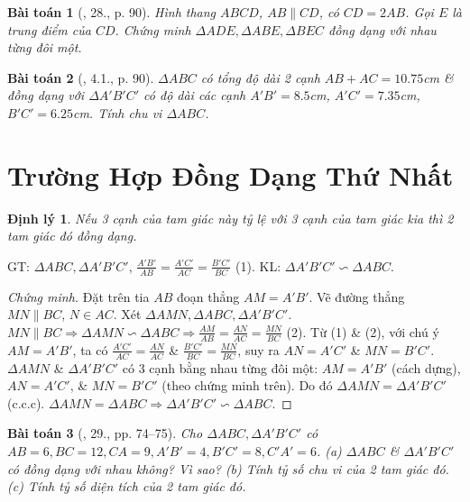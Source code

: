 \documentclass{article}
\newtheorem{baitoan}{Bài toán}
\newtheorem{dinhly}{Định lý}
\begin{document}
\begin{baitoan}[\cite{SBT_Toan_8_tap_2}, 28., p. 90]
	Hình thang $ABCD$, $AB\parallel CD$, có $CD = 2AB$. Gọi $E$ là trung điểm của $CD$. Chứng minh $\Delta ADE,\Delta ABE,\Delta BEC$ đồng dạng với nhau từng đôi một.
\end{baitoan}

\begin{baitoan}[\cite{SBT_Toan_8_tap_2}, 4.1., p. 90]
	$\Delta ABC$ có tổng độ dài 2 cạnh $AB + AC = 10.75$\emph{cm} \& đồng dạng với $\Delta A'B'C'$ có độ dài các cạnh $A'B' = 8.5$\emph{cm}, $A'C' = 7.35$\emph{cm}, $B'C' = 6.25$\emph{cm}. Tính chu vi $\Delta ABC$.
\end{baitoan}


\section{Trường Hợp Đồng Dạng Thứ Nhất}

\begin{dinhly}
	Nếu 3 cạnh của tam giác này tỷ lệ với 3 cạnh của tam giác kia thì 2 tam giác đó đồng dạng.
\end{dinhly}
GT: $\Delta ABC,\Delta A'B'C'$, $\frac{A'B'}{AB} = \frac{A'C'}{AC} = \frac{B'C'}{BC}$ (1). KL: $\Delta A'B'C'\backsim\Delta ABC$.

\begin{proof}[Chứng minh]
	Đặt trên tia $AB$ đoạn thẳng $AM = A'B'$. Vẽ đường thẳng $MN\parallel BC$, $N\in AC$. Xét $\Delta AMN,\Delta ABC,\Delta A'B'C'$. $MN\parallel BC\Rightarrow\Delta AMN\backsim\Delta ABC\Rightarrow\frac{AM}{AB} = \frac{AN}{AC} = \frac{MN}{BC}$ (2). Từ (1) \& (2), với chú ý $AM = A'B'$, ta có $\frac{A'C'}{AC} = \frac{AN}{AC}$ \& $\frac{B'C'}{BC} = \frac{MN}{BC}$, suy ra $AN = A'C'$ \& $MN = B'C'$. $\Delta AMN$ \& $\Delta A'B'C'$ có 3 cạnh bằng nhau từng đôi một: $AM = A'B'$ (cách dựng), $AN = A'C'$, \& $MN = B'C'$ (theo chứng minh trên). Do đó $\Delta AMN = \Delta A'B'C'$ (c.c.c). $\Delta AMN = \Delta ABC\Rightarrow\Delta A'B'C'\backsim\Delta ABC$.
\end{proof}

\begin{baitoan}[\cite{SGK_Toan_8_tap_2}, 29., pp. 74--75]
	Cho $\Delta ABC,\Delta A'B'C'$ có $AB = 6, BC = 12, CA = 9, A'B' = 4, B'C' = 8, C'A' = 6$. (a) $\Delta ABC$ \& $\Delta A'B'C'$ có đồng dạng với nhau không? Vì sao? (b) Tính tỷ số chu vi của 2 tam giác đó. (c) Tính tỷ số diện tích của 2 tam giác đó.
\end{baitoan}
\end{document}
